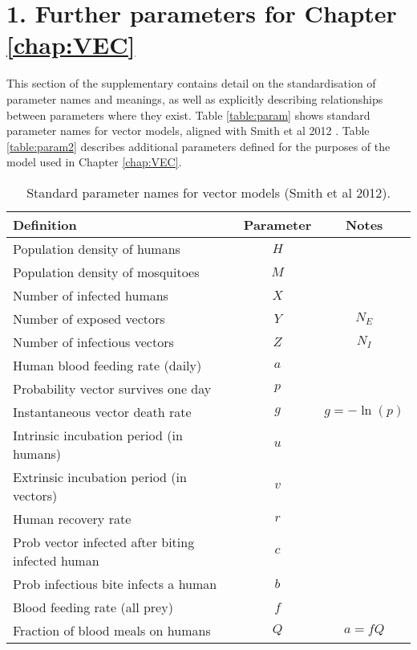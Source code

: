 \section*{1. Further parameters for Chapter \ref{chap:VEC}}

This section of the supplementary contains detail on the standardisation of parameter names and meanings, as well as explicitly describing relationships between parameters where they exist. Table \ref{table:param} shows standard parameter names for vector models, aligned with Smith et al 2012 \cite{Smith2012}. Table \ref{table:param2} describes additional parameters defined for the purposes of the model used in Chapter \ref{chap:VEC}.

\begin{table*}[ht]
\caption[Vector model notation.]{Standard parameter names for vector models (Smith et al 2012).}%
\vspace{.1cm}
\centering %
\begin{tabular}{l c c}%
\hline\hline                        %
Definition & Parameter & Notes \\ [0.5ex]%
\hline                  %
Population density of humans & $H$ &  \\
Population density of mosquitoes & $M$ &  \\
Number of infected humans & $X$ &  \\
Number of exposed vectors & $Y$ & $N_E$ \\
Number of infectious vectors & $Z$ & $N_I$ \\
Human blood feeding rate (daily) & $a$ & \\
Probability vector survives one day & $p$ & \\
Instantaneous vector death rate & $g$ & $g=-\ln(p)$  \\
Intrinsic incubation period (in humans) & $u$ & \\
Extrinsic incubation period (in vectors) & $v$ & \\
Human recovery rate & $r$ & \\
Prob vector infected after biting infected human & $c$ & \\
Prob infectious bite infects a human & $b$ & \\
Blood feeding rate (all prey) & $f$ & \\
Fraction of blood meals on humans & $Q$ & $a=fQ$ \\

\end{tabular}
\end{table*}
